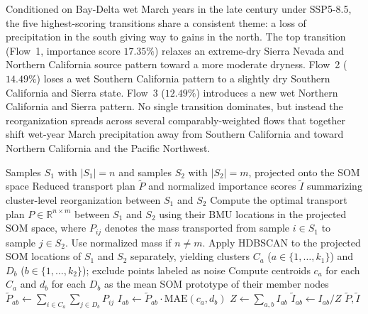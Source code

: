 Conditioned on Bay-Delta wet March years in the late century under SSP5-8.5, the five highest-scoring transitions share a consistent theme: a loss of precipitation in the south giving way to gains in the north.
%
The top transition (Flow~1, importance score $17.35\%$) relaxes an extreme-dry Sierra Nevada and Northern California source pattern toward a more moderate dryness.
%
Flow~2 ($14.49\%$) loses a wet Southern California pattern to a slightly dry Southern California and Sierra state.
%
Flow~3 ($12.49\%$) introduces a new wet Northern California and Sierra pattern.
%
No single transition dominates, but instead the reorganization spreads across several comparably-weighted flows that together shift wet-year March precipitation away from Southern California and toward Northern California and the Pacific Northwest.
%
\begin{algorithm}[h!]
\caption{Clustering-based decomposition of distributional reorganization}
\label{alg:decomposition}
\begin{algorithmic}[1]
\Require Samples $S_1$ with $|S_1| = n$ and samples $S_2$ with $|S_2| = m$, projected onto the SOM space
\Ensure Reduced transport plan $\tilde{P}$ and normalized importance scores $\tilde{I}$ summarizing cluster-level reorganization between $S_1$ and $S_2$
\State Compute the optimal transport plan $P \in \mathbb{R}^{n \times m}$ between $S_1$ and $S_2$ using their BMU locations in the projected SOM space, where $P_{ij}$ denotes the mass transported from sample $i \in S_1$ to sample $j \in S_2$. Use normalized mass if $n\neq m$.
\State Apply HDBSCAN to the projected SOM locations of $S_1$ and $S_2$ separately, yielding clusters $C_a$ ($a \in \{1, \dots, k_1\}$) and $D_b$ ($b \in \{1, \dots, k_2\}$); exclude points labeled as noise
\State Compute centroids $c_a$ for each $C_a$ and $d_b$ for each $D_b$ as the mean SOM prototype of their member nodes
    \State $\tilde{P}_{ab} \gets \sum_{i \in C_a} \sum_{j \in D_b} P_{ij}$
    \State $I_{ab} \gets \tilde{P}_{ab} \cdot \mathrm{MAE}(c_a, d_b)$ 
\EndFor
\State $Z \gets \sum_{a, b} I_{ab}$ 
    \State $\tilde{I}_{ab} \gets I_{ab} / Z$ 
\EndFor
\State \Return $\tilde{P}, \tilde{I}$
\end{algorithmic}
\end{algorithm}

